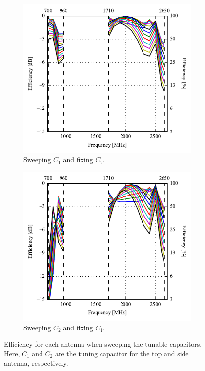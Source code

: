 \begin{figure}[htbp]
    \centering
    \begin{subfigure}{0.49\linewidth}
        \includegraphics{img/tech_sol/monopole/free_space/efficiency-ac1-csh1}
        \caption{Sweeping $C_1$ and fixing $C_2$.}
    \end{subfigure}
    \hfill
    \begin{subfigure}{0.49\linewidth}
        \includegraphics{img/tech_sol/monopole/free_space/efficiency-ac2-csh2}
        \caption{Sweeping $C_2$ and fixing $C_1$.}
    \end{subfigure}
    \caption{Efficiency for each antenna when sweeping the tunable capacitors. Here, $C_1$ and $C_2$ are the tuning capacitor for the top and side antenna, respectively.}
    \label{fig:eff_sol1_free}
\end{figure}

